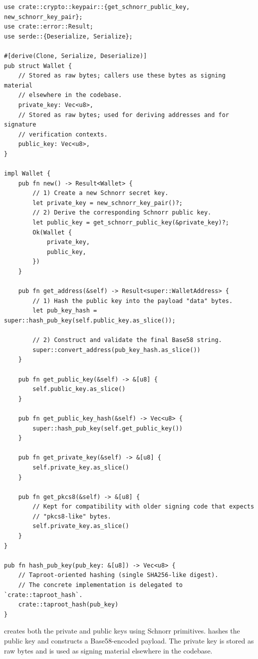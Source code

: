 \begin{listing}[htbp]
\caption{ implementation ()}
\label{lst:ch14-wallet-struct}
\begin{verbatim}
use crate::crypto::keypair::{get_schnorr_public_key, new_schnorr_key_pair};
use crate::error::Result;
use serde::{Deserialize, Serialize};

#[derive(Clone, Serialize, Deserialize)]
pub struct Wallet {
    // Stored as raw bytes; callers use these bytes as signing material
    // elsewhere in the codebase.
    private_key: Vec<u8>,
    // Stored as raw bytes; used for deriving addresses and for signature
    // verification contexts.
    public_key: Vec<u8>,
}

impl Wallet {
    pub fn new() -> Result<Wallet> {
        // 1) Create a new Schnorr secret key.
        let private_key = new_schnorr_key_pair()?;
        // 2) Derive the corresponding Schnorr public key.
        let public_key = get_schnorr_public_key(&private_key)?;
        Ok(Wallet {
            private_key,
            public_key,
        })
    }

    pub fn get_address(&self) -> Result<super::WalletAddress> {
        // 1) Hash the public key into the payload "data" bytes.
        let pub_key_hash = super::hash_pub_key(self.public_key.as_slice());

        // 2) Construct and validate the final Base58 string.
        super::convert_address(pub_key_hash.as_slice())
    }

    pub fn get_public_key(&self) -> &[u8] {
        self.public_key.as_slice()
    }

    pub fn get_public_key_hash(&self) -> Vec<u8> {
        super::hash_pub_key(self.get_public_key())
    }

    pub fn get_private_key(&self) -> &[u8] {
        self.private_key.as_slice()
    }

    pub fn get_pkcs8(&self) -> &[u8] {
        // Kept for compatibility with older signing code that expects
        // "pkcs8-like" bytes.
        self.private_key.as_slice()
    }
}

pub fn hash_pub_key(pub_key: &[u8]) -> Vec<u8> {
    // Taproot-oriented hashing (single SHA256-like digest).
    // The concrete implementation is delegated to `crate::taproot_hash`.
    crate::taproot_hash(pub_key)
}
\end{verbatim}
\end{listing}

\begin{checkpointbox}
 creates both the private and public keys using Schnorr primitives.  hashes the public key and constructs a Base58-encoded payload. The private key is stored as raw bytes and is used as signing material elsewhere in the codebase.
\end{checkpointbox}

